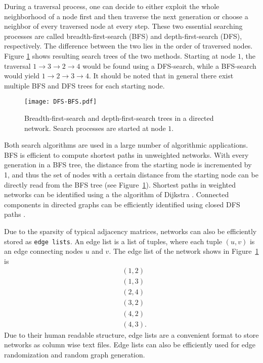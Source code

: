 During a traversal process, one can decide to either exploit the whole neighborhood of a node first and then traverse the next generation or choose a neighbor of every traversed node at every step.
These two essential searching processes are called breadth-first-search (BFS) and depth-first-search (DFS), respectively.
The difference between the two lies in the order of traversed nodes.
Figure \ref{fig:dfs_bfs} shows resulting search trees of the two methods.
Starting at node $1$, the traversal $1\rightarrow 3 \rightarrow 2 \rightarrow 4$ would be found using a DFS-search, while a BFS-search would yield $1\rightarrow 2 \rightarrow 3 \rightarrow 4$.
It should be noted that in general there exist multiple BFS and DFS trees for each starting node. 
%
\begin{figure}[htb]
\begin{center}
\texttt{[image: DFS-BFS.pdf]}
\caption{Breadth-first-search and depth-first-search trees in a directed network. Search processes are started at node $1$.}
\label{fig:dfs_bfs}
\end{center}
\end{figure}

Both search algorithms are used in a large number of algorithmic applications.
BFS is efficient to compute shortest paths in unweighted networks.
With every generation in a BFS tree, the distance from the starting node is incremented by 1, and thus the set of nodes with a certain distance from the starting node can be directly read from the BFS tree (see Figure~\ref{fig:dfs_bfs}).
Shortest paths in weighted networks can be identified using a the algorithm of Dijkstra \citep{Dijkstra:1959}.
Connected components in directed graphs can be efficiently identified using closed DFS paths \citep{algorithm_design}.

Due to the sparsity of typical adjacency matrices, networks can also be efficiently stored as \verb"edge lists".
An edge list is a list of tuples, where each tuple $(u,v)$ is an edge connecting nodes $u$ and $v$.
The edge list of the network shows in Figure~\ref{fig:dfs_bfs} is
\begin{align*}
&(1,2)\\
&(1,3)\\
&(2,4)\\
&(3,2)\\
&(4,2)\\
&(4,3) .
\end{align*}
Due to their human readable structure, edge lists are a convenient format to store networks as column wise text files.
Edge lists can also be efficiently used for edge randomization and random graph generation.

